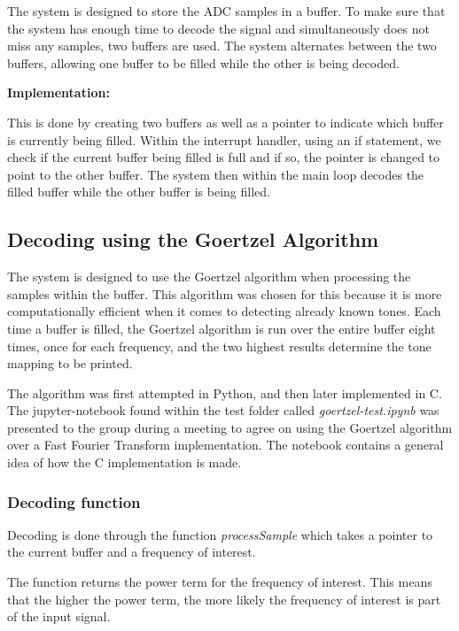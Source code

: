 \documentclass{cce2014-design}
\begin{document}
The system is designed to store the ADC samples in a buffer. To make sure that the system has enough time to decode the signal and simultaneously does not miss any samples, two buffers are used. The system alternates between the two buffers, allowing one buffer to be filled while the other is being decoded.

\vspace{1em}
\textbf{Implementation:}

This is done by creating two buffers as well as a pointer to indicate which buffer is currently being filled. Within the interrupt handler, using an if statement, we check if the current buffer being filled is full and if so, the pointer is changed to point to the other buffer. The system then within the main loop decodes the filled buffer while the other buffer is being filled.

\subsection{Decoding using the Goertzel Algorithm}

The system is designed to use the Goertzel algorithm when processing the samples within the buffer.
This algorithm was chosen for this because it is more computationally efficient when it comes to detecting already known tones.
Each time a buffer is filled, the Goertzel algorithm is run over the entire buffer eight times, once for each frequency, and the two highest results determine the tone mapping to be printed.

The algorithm was first attempted in Python, and then later implemented in C.
The jupyter-notebook found within the test folder called \textit{goertzel-test.ipynb} was presented to the group during a meeting to agree on using the Goertzel algorithm over a Fast Fourier Transform implementation.
The notebook contains a general idea of how the C implementation is made.

\subsubsection{Decoding function}

Decoding is done through the function \textit{processSample} which takes a pointer to the current buffer and a frequency of interest.

The function returns the power term for the frequency of interest.
This means that the higher the power term, the more likely the frequency of interest is part of the input signal.
\end{document}
